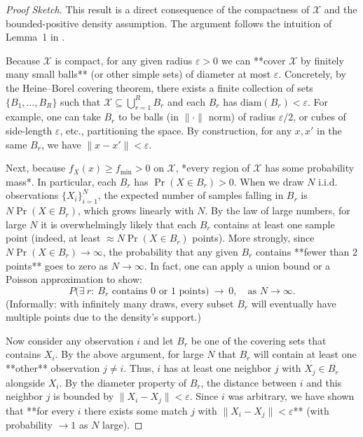 \documentclass{mytemplate}
\begin{document}
\begin{proof}[Proof Sketch]
This result is a direct consequence of the compactness of $\mathcal{X}$ and the bounded-positive density assumption. The argument follows the intuition of Lemma 1 in \citet{abadie2006large}.

Because $\mathcal{X}$ is compact, for any given radius $\varepsilon>0$ we can **cover $\mathcal{X}$ by finitely many small balls** (or other simple sets) of diameter at most $\varepsilon$.  Concretely, by the Heine–Borel covering theorem, there exists a finite collection of sets $\{B_1,\ldots,B_R\}$ such that $\mathcal{X}\subseteq \bigcup_{r=1}^R B_r$ and each $B_r$ has $\text{diam}(B_r) < \varepsilon$. For example, one can take $B_r$ to be balls (in $\|\cdot\|$ norm) of radius $\varepsilon/2$, or cubes of side-length $\varepsilon$, etc., partitioning the space. By construction, for any $x,x'$ in the same $B_r$, we have $\|x - x'\| < \varepsilon$.

Next, because $f_X(x)\ge f_{\min} > 0$ on $\mathcal{X}$, *every region of $\mathcal{X}$ has some probability mass*. In particular, each $B_r$ has $\Pr(X\in B_r) > 0$. When we draw $N$ i.i.d. observations $\{X_i\}_{i=1}^N$, the expected number of samples falling in $B_r$ is $N\Pr(X\in B_r)$, which grows linearly with $N$. By the law of large numbers, for large $N$ it is overwhelmingly likely that each $B_r$ contains at least one sample point (indeed, at least $\approx N\Pr(X\in B_r)$ points). More strongly, since $N\Pr(X\in B_r) \to\infty$, the probability that any given $B_r$ contains **fewer than 2 points** goes to zero as $N\to\infty$. In fact, one can apply a union bound or a Poisson approximation to show:
$$
P\Big(\exists~r:~ B_r \text{ contains 0 or 1 points}\Big) ~\to~ 0, \quad \text{as } N\to\infty.
$$ 
(Informally: with infinitely many draws, every subset $B_r$ will eventually have multiple points due to the density’s support.)

Now consider any observation $i$ and let $B_r$ be one of the covering sets that contains $X_i$. By the above argument, for large $N$ that $B_r$ will contain at least one **other** observation $j \ne i$. Thus, $i$ has at least one neighbor $j$ with $X_j \in B_r$ alongside $X_i$. By the diameter property of $B_r$, the distance between $i$ and this neighbor $j$ is bounded by $\|X_i - X_j\| < \varepsilon$. Since $i$ was arbitrary, we have shown that **for every $i$ there exists some match $j$ with $\|X_i - X_j\| < \varepsilon$** (with probability $\to 1$ as $N$ large).


\end{proof}
\end{document}
